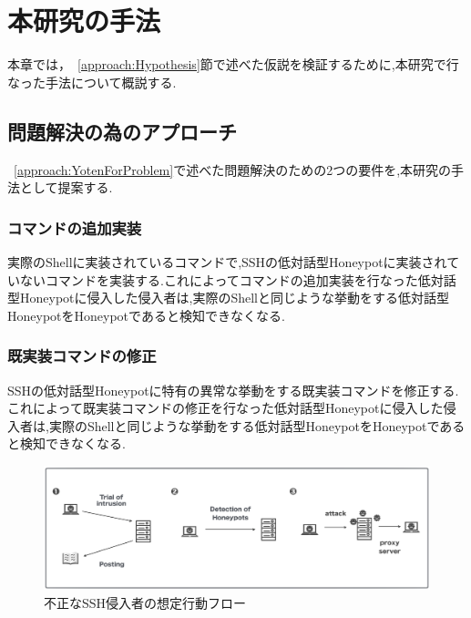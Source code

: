 \chapter{本研究の手法}
\label{method}

本章では，~\ref{approach:Hypothesis}節で述べた仮説を検証するために,本研究で行なった手法について概説する.

\section{問題解決の為のアプローチ}
\label{method:approach}
 ~\ref{approach:YotenForProblem}で述べた問題解決のための2つの要件を,本研究の手法として提案する.

 \subsection{コマンドの追加実装}
実際のShellに実装されているコマンドで,SSHの低対話型Honeypotに実装されていないコマンドを実装する.これによってコマンドの追加実装を行なった低対話型Honeypotに侵入した侵入者は,実際のShellと同じような挙動をする低対話型HoneypotをHoneypotであると検知できなくなる.

 \subsection{既実装コマンドの修正}
 SSHの低対話型Honeypotに特有の異常な挙動をする既実装コマンドを修正する.これによって既実装コマンドの修正を行なった低対話型Honeypotに侵入した侵入者は,実際のShellと同じような挙動をする低対話型HoneypotをHoneypotであると検知できなくなる.


\vspace{10mm}
\begin{figure}[H]
    \centering
    \includegraphics[width=1.0\textwidth]{figures/nagare.png}
    \caption{不正なSSH侵入者の想定行動フロー}
    \label{fig:evo}
\end{figure}
 
